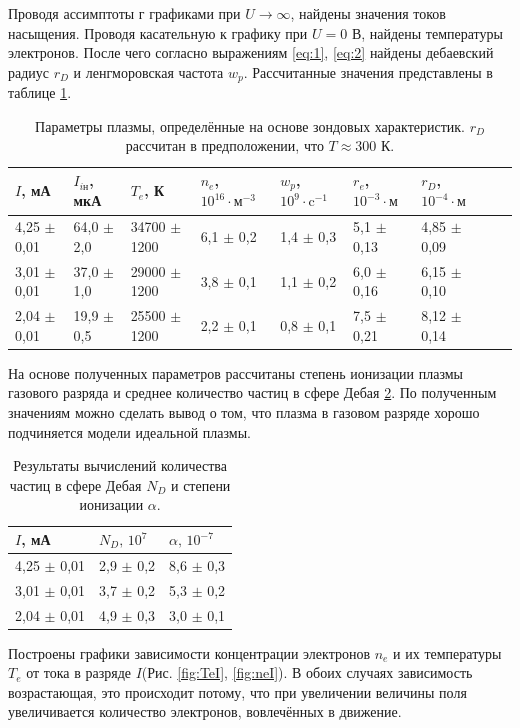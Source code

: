 \documentclass[12pt]{article}
\begin{document}
Проводя ассимптоты г графиками при $U \to \infty$, найдены значения токов насыщения.
Проводя касательную к графику при $U = 0$ В, найдены температуры электронов. После чего согласно
выражениям \ref{eq:1}, \ref{eq:2} найдены дебаевский радиус $r_D$ и ленгморовская частота $w_p$.
Рассчитанные значения представлены в таблице \ref{tab:3}.
\begin{table}[H]
	\centering
	\begin{tabular}{|l|l|l|l|l|l|l|l|l|}
		\hline
		$I$, мА         & $I_{i\text{н}}$, мкА & $T_e$, К         & $n_e$, $10^{16} \cdot \text{м}^{-3}$ & $w_p$, $10^9 \cdot \text{c}^{-1} $ & $r_e$, $10^{-3} \cdot \text{м}$ & $r_D$, $10^{-4} \cdot \text{м}$ \\ \hline
		4,25 $\pm$ 0,01 & 64,0 $\pm$ 2,0       & 34700 $\pm$ 1200 & 6,1 $\pm$ 0,2                        & 1,4 $\pm$ 0,3                      & 5,1 $\pm$ 0,13                  & 4,85 $\pm$ 0,09                 \\ \hline
		3,01 $\pm$ 0,01 & 37,0 $\pm$ 1,0       & 29000 $\pm$ 1200 & 3,8 $\pm$ 0,1                        & 1,1 $\pm$ 0,2                      & 6,0 $\pm$ 0,16                  & 6,15 $\pm$ 0,10                 \\ \hline
		2,04 $\pm$ 0,01 & 19,9 $\pm$ 0,5       & 25500 $\pm$ 1200 & 2,2 $\pm$ 0,1                        & 0,8 $\pm$ 0,1                      & 7,5 $\pm$ 0,21                  & 8,12 $\pm$ 0,14                 \\ \hline
	\end{tabular}
	\caption{Параметры плазмы, определённые на основе зондовых характеристик.
		$r_D$ рассчитан в предположении, что $T \approx 300$ К.}
	\label{tab:3}
\end{table}
На основе полученных параметров рассчитаны степень ионизации плазмы газового разряда и среднее количество частиц в сфере Дебая \ref{tab:4}.
По полученным значениям можно сделать вывод о том, что плазма в газовом разряде хорошо подчиняется модели идеальной плазмы.
\begin{table}[H]
	\centering
	\begin{tabular}{|l|l|l|}
		\hline
		$I$, мА         & $N_D, \, 10^7$ & $\alpha, \, 10^{-7} $ \\ \hline
		4,25 $\pm$ 0,01 & 2,9 $\pm$ 0,2  & 8,6 $\pm$ 0,3         \\ \hline
		3,01 $\pm$ 0,01 & 3,7 $\pm$ 0,2  & 5,3 $\pm$ 0,2         \\ \hline
		2,04 $\pm$ 0,01 & 4,9 $\pm$ 0,3  & 3,0 $\pm$ 0,1         \\ \hline
	\end{tabular}
	\caption{Результаты вычислений количества частиц в сфере Дебая $N_D$ и степени ионизации $\alpha$.}
	\label{tab:4}
\end{table}
Построены графики зависимости концентрации электронов $n_e$ и их температуры $T_e$ от тока в разряде $I$(Рис. \ref{fig:TeI}, \ref{fig:neI}).  
В обоих случаях зависимость возрастающая, это происходит потому, что при увеличении величины поля увеличивается количество электронов, 
вовлечённых в движение.
\end{document}
